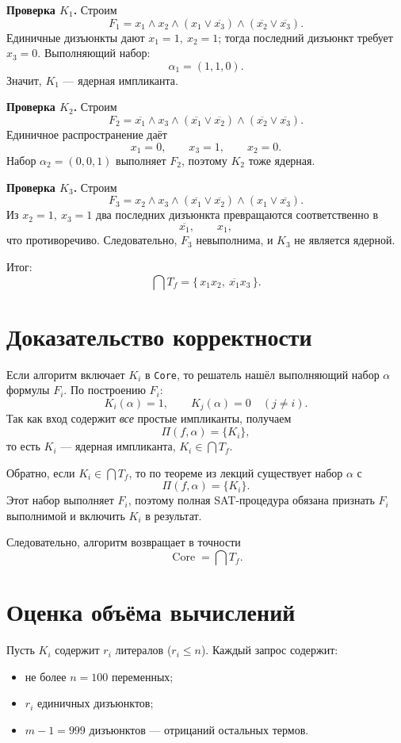 \documentclass[11pt]{article}
\newcommand{\imp}[1]{\overline{#1}}
\begin{document}
\textbf{Проверка $K_1$.} Строим
\[
F_1 =
x_1\land x_2
\land(x_1\vee\imp{x_3})
\land(\imp{x_2}\vee\imp{x_3}).
\]
Единичные дизъюнкты дают $x_1=1,\ x_2=1$; тогда последний дизъюнкт требует $x_3=0$. Выполняющий набор:
\[
\alpha_1=(1,1,0).
\]
Значит, $K_1$ — ядерная импликанта.

\textbf{Проверка $K_2$.} Строим
\[
F_2 =
\imp{x_1}\land x_3
\land(\imp{x_1}\vee\imp{x_2})
\land(\imp{x_2}\vee\imp{x_3}).
\]
Единичное распространение даёт
\[
x_1=0,\qquad x_3=1,\qquad x_2=0.
\]
Набор $\alpha_2=(0,0,1)$ выполняет $F_2$, поэтому $K_2$ тоже ядерная.

\textbf{Проверка $K_3$.} Строим
\[
F_3 =
x_2\land x_3
\land(\imp{x_1}\vee\imp{x_2})
\land(x_1\vee\imp{x_3}).
\]
Из $x_2=1,\ x_3=1$ два последних дизъюнкта превращаются соответственно в
\[
\imp{x_1},\qquad x_1,
\]
что противоречиво. Следовательно, $F_3$ невыполнима, и $K_3$ не является ядерной.

Итог:
\[
\boxed{\;\bigcap T_f = \{\,x_1x_2,\ \imp{x_1}x_3\,\}.\;}
\]

\section{Доказательство корректности}

Если алгоритм включает $K_i$ в \texttt{Core}, то решатель нашёл выполняющий набор $\alpha$ формулы $F_i$. По построению $F_i$:
\[
K_i(\alpha)=1,\qquad K_j(\alpha)=0\quad (j\ne i).
\]
Так как вход содержит \emph{все} простые импликанты, получаем
\[
\Pi(f,\alpha)=\{K_i\},
\]
то есть $K_i$ — ядерная импликанта, $K_i\in\bigcap T_f$.

Обратно, если $K_i\in\bigcap T_f$, то по теореме из лекций существует набор $\alpha$ с
\[
\Pi(f,\alpha)=\{K_i\}.
\]
Этот набор выполняет $F_i$, поэтому полная SAT-процедура обязана признать $F_i$ выполнимой и включить $K_i$ в результат.

Следовательно, алгоритм возвращает в точности
\[
\boxed{\;\operatorname{Core} = \bigcap T_f.\;}
\]

\section{Оценка объёма вычислений}

Пусть $K_i$ содержит $r_i$ литералов ($r_i\le n$). Каждый запрос содержит:

\begin{itemize}
\item не более $n=100$ переменных;
\item $r_i$ единичных дизъюнктов;
\item $m-1=999$ дизъюнктов — отрицаний остальных термов.
\end{itemize}
\end{document}
